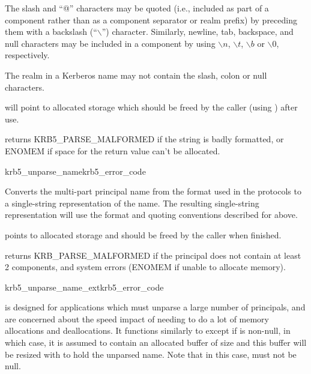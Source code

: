 The slash and ``@'' characters may be quoted (i.e., included as part
of a component rather than as a component separator or realm prefix)
by preceding them with a backslash (``$\backslash$'') character.
Similarly, newline, tab, backspace, and null characters may be
included in a component by using $\backslash{}n$, $\backslash{}t$,
$\backslash{}b$ or $\backslash{}0$, respectively.

The realm in a Kerberos name may not contain the slash, colon or null
characters.

 will point to allocated storage which should be freed by
the caller (using ) after use.

 returns KRB5_PARSE_MALFORMED if the string is
 badly formatted, or ENOMEM if space for the return value can't be
allocated.

\begin{funcdecl}{krb5_unparse_name}{krb5_error_code}{\funcinout}
\funcin
{}
\funcout
{}
\end{funcdecl}

Converts the multi-part principal name  from the
format used in the protocols to a single-string representation of the
name.  The resulting single-string representation will use the format
and quoting conventions described for 
above.

 points to allocated storage and should be freed by the caller
when finished.

 returns {\sc KRB_PARSE_MALFORMED} if the principal
does not contain at least 2 components, and system errors ({\sc ENOMEM} if
unable to allocate memory).

\begin{funcdecl}{krb5_unparse_name_ext}{krb5_error_code}{\funcinout}
\funcin
{}
\funcinout
{}
\end{funcdecl}

 is designed for applications which
must unparse a large number of principals, and are concerned about the
speed impact of needing to do a lot of memory allocations and
deallocations.  It functions similarly to 
except if  is non-null, in which case, it is assumed
to contain an allocated buffer of size  and this
buffer will be resized with  to hold the unparsed
name.  Note that in this case,
 must not be null.  


